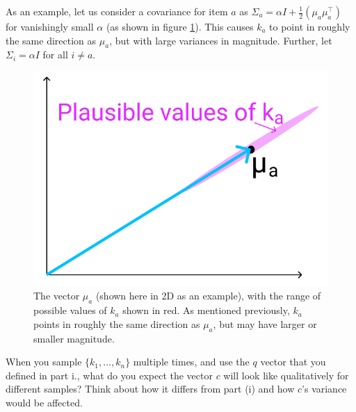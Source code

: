 \begin{parts}
\begin{subparts}
As an example, let us consider a covariance for item $a$ as $\Sigma_a = \alpha I + \frac{1}{2}(\mu_a\mu_a^\top)$ for vanishingly small $\alpha$ (as shown in figure \ref{ka_plausible}). This causes $k_a$ to point in roughly the same direction as $\mu_a$, but with large variances in magnitude. Further, let $\Sigma_i = \alpha I$ for all $i \neq a$.
\begin{figure}[h]
\centering
\captionsetup{justification=centering,margin=2cm}
\includegraphics[width=0.35\linewidth]{images/ka_plausible.png}
\caption{The vector $\mu_a$ (shown here in 2D as an example), with the range of possible values of $k_a$ shown in red. As mentioned previously, $k_a$ points in roughly the same direction as $\mu_a$, but may have larger or smaller magnitude.}
\label{ka_plausible}
\end{figure}

When you sample $\{k_1,\dots,k_n\}$ multiple times, and use the $q$ vector that you defined in part i., what do you expect the vector $c$ will look like qualitatively for different samples? Think about how it differs from part (i) and how $c$'s variance would be affected.

\end{subparts}


\end{parts}
